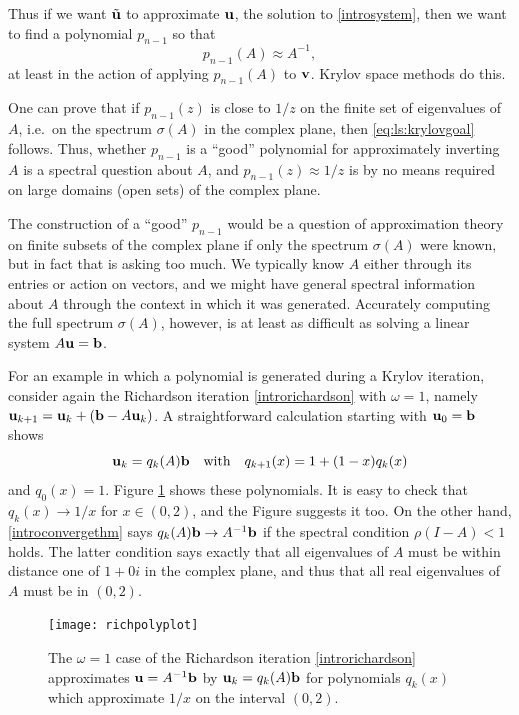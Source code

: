 Thus if we want $\tilde{\mathbf{u}}$ to approximate $\mathbf{u}$, the solution to \eqref{introsystem}, then we want to find a polynomial $p_{n-1}$ so that
\begin{equation}
    p_{n-1}(A) \approx A^{-1},  \label{eq:ls:krylovgoal}
\end{equation}
at least in the action of applying $p_{n-1}(A)$ to $\mathbf{v}$.  Krylov space methods do this.

One can prove that if $p_{n-1}(z)$ is close to $1/z$ on the finite set of eigenvalues of $A$, i.e.~on the spectrum $\sigma(A)$ in the complex plane, then \eqref{eq:ls:krylovgoal} follows.  Thus, whether $p_{n-1}$ is a ``good'' polynomial for approximately inverting $A$ is a spectral question about $A$, and $p_{n-1}(z) \approx 1/z$ is by no means required on large domains (open sets) of the complex plane.

The construction of a ``good'' $p_{n-1}$ would be a question of approximation theory on finite subsets of the complex plane if only the spectrum $\sigma(A)$ were known, but in fact that is asking too much.  We typically know $A$ either through its entries or action on vectors, and we might have general spectral information about $A$ through the context in which it was generated.   Accurately computing the full spectrum $\sigma(A)$, however, is at least as difficult as solving a linear system $A\mathbf{u}=\mathbf{b}$.

For an example in which a polynomial is generated during a Krylov iteration, consider again the Richardson iteration \eqref{introrichardson} with $\omega=1$, namely $\mathbf{u}_{k+1} = \mathbf{u}_k + (\mathbf{b} - A \mathbf{u}_k)$.  A straightforward calculation starting with $\mathbf{u}_0=\mathbf{b}$ shows
\begin{equation}
	\mathbf{u}_k = q_k(A) \mathbf{b} \quad \text{with} \quad q_{k+1}(x) = 1 + (1-x) q_k(x)  \label{richpolys}
\end{equation}
and $q_0(x)=1$.
Figure \ref{fig:richpolyplot} shows these polynomials.  It is easy to check that $q_k(x) \to 1/x$ for $x\in (0,2)$, and the Figure suggests it too.  On the other hand, \eqref{introconvergethm} says $q_k(A) \mathbf{b} \to A^{-1} \mathbf{b}$ if the spectral condition $\rho(I-A)<1$ holds.  The latter condition says exactly that all eigenvalues of $A$ must be within distance one of $1+0i$ in the complex plane, and thus that all real eigenvalues of $A$ must be in $(0,2)$.

\begin{figure}
\bigskip
\texttt{[image: richpolyplot]}
\caption{The $\omega=1$ case of the Richardson iteration \eqref{introrichardson} approximates $\mathbf{u}=A^{-1}\mathbf{b}$ by $\mathbf{u}_k=q_k(A)\mathbf{b}$ for polynomials $q_k(x)$ which approximate $1/x$ on the interval $(0,2)$.}
\label{fig:richpolyplot}
\end{figure}


